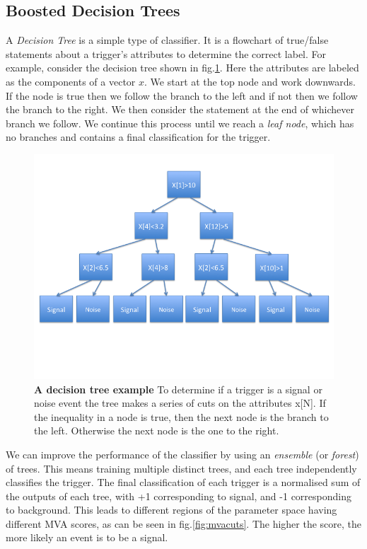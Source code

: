 \documentclass[11pt]{cuthesis}
\begin{document}
\subsection{Boosted Decision Trees} \label{bdt}
A \textit{Decision Tree} is a simple type of classifier. It is a flowchart of true/false statements about a trigger's attributes to determine the correct label. For example, consider the decision tree shown in fig.\ref{fig:tree}. Here the attributes are labeled as the components of a vector $x$. We start at the top node and work downwards. If the node is true then we follow the branch to the left and if not then we follow the branch to the right. We then consider the statement at the end of whichever branch we follow. We continue this process until we reach a \textit{leaf node}, which has no branches and contains a final classification for the trigger.  
\begin{figure} %
\begin{center}
\includegraphics[width=0.8\linewidth]{Decision_tree.png}
\end{center}
\caption{\textbf{A decision tree example} To determine if a trigger is a signal or noise event the tree makes a series of cuts on the attributes x[N]. If the inequality in a node is true, then the next node is the branch to the left. Otherwise the next node is the one to the right. }
\label{fig:tree}
\end{figure}

We can improve the performance of the classifier by using an \textit{ensemble} (or \textit{forest}) of trees. This means training multiple distinct trees, and each tree independently classifies the trigger. The final classification of each trigger is a normalised sum of the outputs of each tree, with +1 corresponding to signal, and -1 corresponding to background. This leads to different regions of the parameter space having different MVA scores, as can be seen in fig.\ref{fig:mvacuts}. The higher the score, the more likely an event is to be a signal. 
\end{document}
